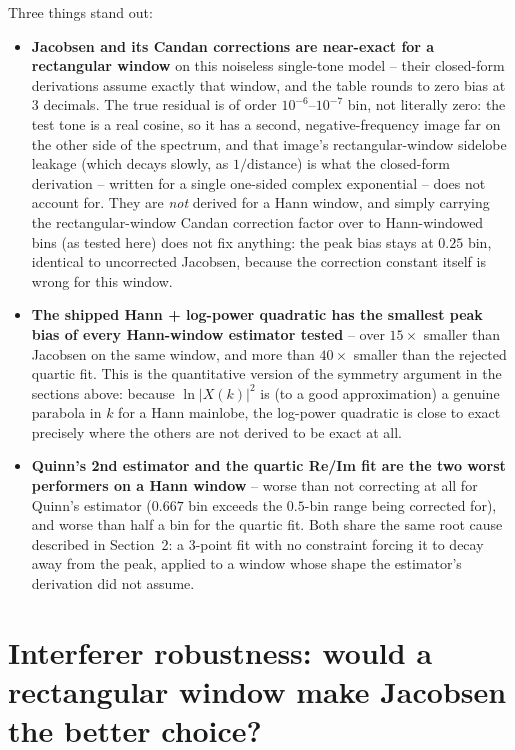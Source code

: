 \documentclass[11pt]{article}
\begin{document}
Three things stand out:
\begin{itemize}
  \item \textbf{Jacobsen and its Candan corrections are near-exact for
        a rectangular window} on this noiseless single-tone model --
        their closed-form derivations assume exactly that window, and
        the table rounds to zero bias at 3 decimals. The true residual
        is of order $10^{-6}$--$10^{-7}$ bin, not literally zero: the
        test tone is a real cosine, so it has a second, negative-frequency
        image far on the other side of the spectrum, and that image's
        rectangular-window sidelobe leakage (which decays slowly, as
        $1/\text{distance}$) is what the closed-form derivation --
        written for a single one-sided complex exponential -- does not
        account for. They are
        \emph{not} derived for a Hann window, and simply carrying the
        rectangular-window Candan correction factor over to
        Hann-windowed bins (as tested here) does not fix anything: the
        peak bias stays at $0.25$ bin, identical to uncorrected
        Jacobsen, because the correction constant itself is wrong for
        this window.
  \item \textbf{The shipped Hann + log-power quadratic has the
        smallest peak bias of every Hann-window estimator tested} --
        over $15\times$ smaller than Jacobsen on the same window, and
        more than $40\times$ smaller than the rejected quartic fit.
        This is the quantitative version of the symmetry argument in
        the sections above: because $\ln|X(k)|^2$ is (to a good
        approximation) a genuine parabola in $k$ for a Hann mainlobe,
        the log-power quadratic is close to exact precisely where the
        others are not derived to be exact at all.
  \item \textbf{Quinn's 2nd estimator and the quartic Re/Im fit are
        the two worst performers on a Hann window} -- worse than not
        correcting at all for Quinn's estimator ($0.667$ bin exceeds
        the $0.5$-bin range being corrected for), and worse than half
        a bin for the quartic fit. Both share the same root cause
        described in Section~2: a 3-point fit with no constraint
        forcing it to decay away from the peak, applied to a window
        whose shape the estimator's derivation did not assume.
\end{itemize}

\section{Interferer robustness: would a rectangular window make Jacobsen the better choice?}
\label{sec:interferer}
\end{document}

